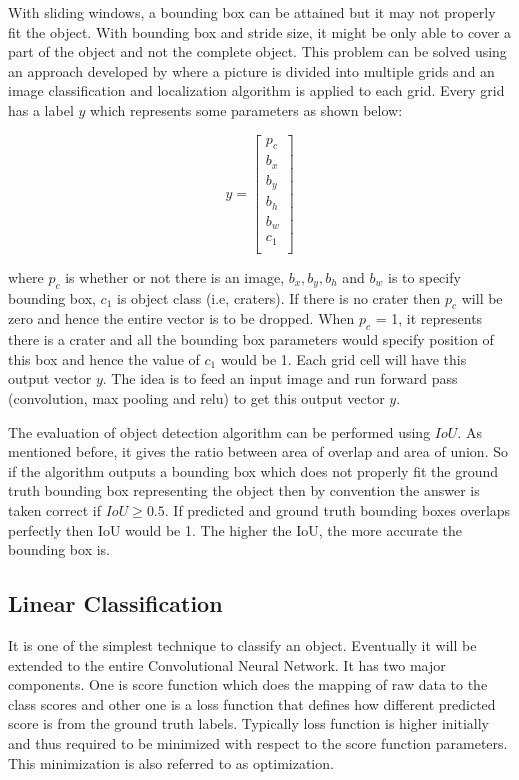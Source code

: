 \documentclass[11pt]{article}
\begin{document}
With sliding windows, a bounding box can be attained but it may not properly fit the object. With bounding box and stride size, it might be only able to cover a part of the object and not the complete object. This problem can be solved using an approach developed by \cite{redmon_you_2016} where a picture is divided into multiple grids and an image classification and localization algorithm is applied to each grid. Every grid has a label $y$ which represents some parameters as shown below:

$$
y =
\begin{bmatrix}
p_c\\
b_x\\
b_y\\
b_h\\
b_w\\
c_1\\
\end{bmatrix}
$$

where $p_c$ is whether or not there is an image, $b_x, b_y, b_h$ and $b_w$ is to specify bounding box, $c_1$ is object class (i.e, craters). If there is no crater then $p_c$ will be zero and hence the entire vector is to be dropped. When $p_c$ = 1, it represents there is a crater and all the bounding box parameters would specify position of this box and hence the value of $c_1$ would be 1. Each grid cell will have this output vector $y$. The idea is to feed an input image and run forward pass (convolution, max pooling and relu) to get this output vector $y$.

The evaluation of object detection algorithm can be performed using $IoU$. As mentioned before, it gives the ratio between area of overlap and area of union. So if the algorithm outputs a bounding box which does not properly fit the ground truth bounding box representing the object then by convention the answer is taken correct if $IoU \geq 0.5$. If predicted and ground truth bounding boxes overlaps perfectly then IoU would be 1. The higher the IoU, the more accurate the bounding box is.

\subsection{Linear Classification}
It is one of the simplest technique to classify an object. Eventually it will be extended to the entire Convolutional Neural Network. It has two major components. One is score function which does the mapping of raw data to the class scores and other one is a loss function that defines how different predicted score is from the ground truth labels. Typically loss function is higher initially and thus required to be minimized with respect to the score function parameters. This minimization is also referred to as optimization. 
\end{document}
